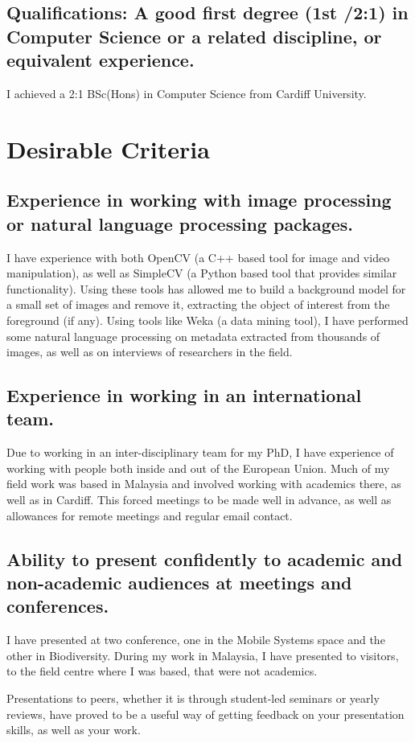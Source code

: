 \documentclass[10pt,a4paper]{article}
\begin{document}
\subsection{Qualifications: A good first degree (1st /2:1) in Computer Science or a related discipline, or equivalent experience.}
I achieved a 2:1 BSc(Hons) in Computer Science from Cardiff University.

\section{Desirable Criteria}
\subsection{Experience in working with image processing or natural language processing packages.}
I have experience with both OpenCV (a C++ based tool for image and video manipulation), as well as SimpleCV (a Python based tool that provides similar functionality). Using these tools has allowed me to build a background model for a small set of images and remove it, extracting the object of interest from the foreground (if any). 
Using tools like Weka (a data mining tool), I have performed some natural language processing on metadata extracted from thousands of images, as well as on interviews of researchers in the field.

\subsection{Experience in working in an international team.}
Due to working in an inter-disciplinary team for my PhD, I have experience of working with people both inside and out of the European Union. Much of my field work was based in Malaysia and involved working with academics there, as well as in Cardiff. This forced meetings to be made well in advance, as well as allowances for remote meetings and regular email contact.

\subsection{Ability to present confidently to academic and non-academic audiences at meetings and conferences.}
I have presented at two conference, one in the Mobile Systems space and the other in Biodiversity. During my work in Malaysia, I have presented to visitors, to the field centre where I was based, that were not academics.

Presentations to peers, whether it is through student-led seminars or yearly reviews, have proved to be a useful way of getting feedback on your presentation skills, as well as your work.
\end{document}
